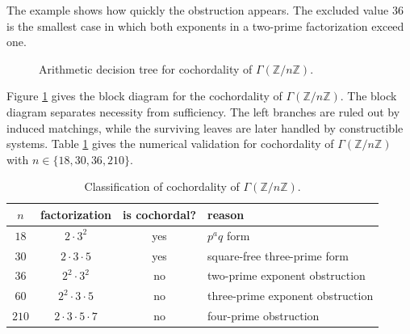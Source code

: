 \documentclass[12pt]{article}
\theoremstyle{definition}
\begin{document}
\medskip

The example shows how quickly the obstruction appears.  The excluded value $36$ is the smallest case in which both exponents in a two-prime factorization exceed one.

\medskip

\begin{figure}[h]
\centering
{}
\caption{Arithmetic decision tree for cochordality of $\Gamma(\mathbb{Z}/n\mathbb{Z})$.}
\label{fig:classification-tree}
\end{figure}

Figure \ref{fig:classification-tree} gives the block diagram for the cochordality of $\Gamma(\mathbb{Z}/n\mathbb{Z})$. The block diagram separates necessity from sufficiency.  The left branches are ruled out by induced matchings, while the surviving leaves are later handled by constructible systems. Table \ref{tab 2} gives the numerical validation for cochordality of $\Gamma(\mathbb{Z}/n\mathbb{Z})$ with  $n\in \{18,30,36,210\}.$

\medskip
\begin{table}[H]
\begin{center}
\begin{tabular}{cccl}
\toprule
$n$ & factorization & is cochordal? & reason\\
\midrule
$18$ & $2\cdot 3^2$ & yes & $p^a q$ form\\
$30$ & $2\cdot 3\cdot 5$ & yes & square-free three-prime form\\
$36$ & $2^2\cdot 3^2$ & no & two-prime exponent obstruction\\
$60$ & $2^2\cdot 3\cdot 5$ & no & three-prime exponent obstruction\\
$210$ & $2\cdot 3\cdot 5\cdot 7$ & no & four-prime obstruction\\
\bottomrule
\end{tabular}
\end{center}
\caption{Classification of cochordality of $\Gamma(\mathbb{Z}/n\mathbb{Z})$.}
\label{tab 2}
\end{table}
\end{document}
